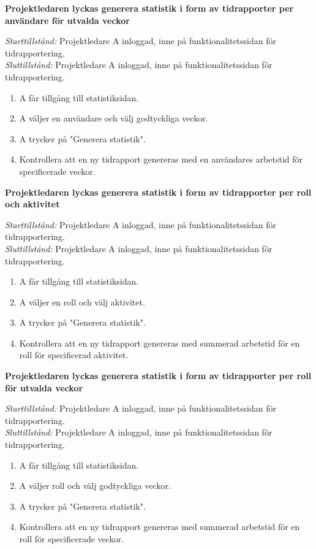 \documentclass[a4paper]{article}
\begin{document}
\begin{FT}
\item
\textbf{Projektledaren lyckas generera statistik i form av tidrapporter per användare för utvalda veckor}

\emph{Starttillstånd:} Projektledare A inloggad, inne på funktionalitetssidan för tidrapportering.\\
\emph{Sluttillstånd:} Projektledare A inloggad, inne på funktionalitetssidan för tidrapportering.

\begin{enumerate}
\item A får tillgång till statistiksidan.
\item A väljer en användare och välj godtyckliga veckor.
\item A trycker på "Generera statistik".
\item Kontrollera att en ny tidrapport genereras med en användares arbetstid för specificerade veckor.
\end{enumerate}


\item
\textbf{Projektledaren lyckas generera statistik i form av tidrapporter per roll och aktivitet}

\emph{Starttillstånd:} Projektledare A inloggad, inne på funktionalitetssidan för tidrapportering.\\
\emph{Sluttillstånd:} Projektledare A inloggad, inne på funktionalitetssidan för tidrapportering.

\begin{enumerate}
\item A får tillgång till statistiksidan.
\item A väljer en roll och välj aktivitet.
\item A trycker på "Generera statistik".
\item Kontrollera att en ny tidrapport genereras med summerad arbetstid för en roll för specificerad aktivitet.
\end{enumerate}


\item
\textbf{Projektledaren lyckas generera statistik i form av tidrapporter per roll för utvalda veckor}

\emph{Starttillstånd:} Projektledare A inloggad, inne på funktionalitetssidan för tidrapportering.\\
\emph{Sluttillstånd:} Projektledare A inloggad, inne på funktionalitetssidan för tidrapportering.

\begin{enumerate}
\item A får tillgång till statistiksidan.
\item A väljer roll och välj godtyckliga veckor.
\item A trycker på "Generera statistik".
\item Kontrollera att en ny tidrapport genereras med summerad arbetstid för en roll för specificerade veckor.
\end{enumerate}



\end{FT}
\end{document}
